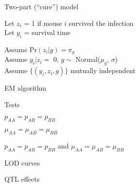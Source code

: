 \documentclass[aspectratio=169,12pt,t]{beamer}
\begin{document}
\begin{frame}{Two-part (``cure'') model}

  \bbi
  \itemsep24pt

  \item Let $z_i$ = 1 if mouse $i$ survived the infection \\[12pt]

  {\color{background} Let} $y_i$ = survival time

\item Assume $\text{Pr}(z_i|g) = \pi_g$ \\[12pt]

  {\color{background} Assume} $y_i | z_i=$ 0, $g \sim$ Normal($\mu_g$,
  $\sigma$) \\[12pt]

  {\color{background} Assume} $\{(y_i, z_i, g)\}$ mutually independent

  \ei

\end{frame}



\begin{frame}{EM algorithm}

\end{frame}



\begin{frame}{Tests}

  \bbi
\item $p_{AA} = p_{AB} = p_{BB}$
\item $\mu_{AA} = \mu_{AB} = \mu_{BB}$
\item $p_{AA} = p_{AB} = p_{BB}$ and $\mu_{AA} = \mu_{AB} = \mu_{BB}$
  \ei


\end{frame}


\begin{frame}[c]{LOD curves}
\end{frame}


\begin{frame}[c]{QTL effects}
\end{frame}
\end{document}
